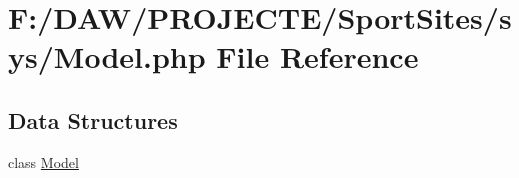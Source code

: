 \hypertarget{_model_8php}{}\section{F\+:/\+D\+A\+W/\+P\+R\+O\+J\+E\+C\+T\+E/\+Sport\+Sites/sys/\+Model.php File Reference}
\label{_model_8php}
\subsection*{Data Structures}
\begin{DoxyCompactItemize}
\item 
class \hyperlink{class_model}{Model}
\end{DoxyCompactItemize}
